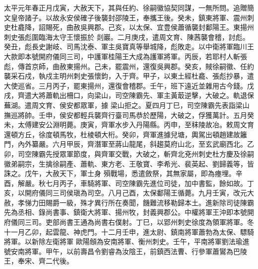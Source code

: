 \begin{pinyinscope}
 太平元年春正月戊寅，大赦天下，其與任約、徐嗣徽協契同謀，一無所問。追贈簡文皇帝諸子。以故永安侯確子後襲封邵陵王，奉攜王後。癸未，鎮東將軍、震州刺史杜龕降，詔賜死，曲赦吳興郡。己亥，以太保、宜豊侯蕭循襲封鄱陽王。東揚州刺史張彪圍臨海太守王懷振於
 剡巖。二月庚戌，遣周文育、陳茜襲會稽，討彪。癸丑，彪長史謝岐、司馬沈泰、軍主吳寶真等舉城降，彪敗走。以中衛將軍臨川王大款即本號開府儀同三司，中護軍桂陽王大成為護軍將軍。丙辰，若耶村人斬張彪，傳首京師，曲赦東揚州。己未，罷震州，還復吳興郡。癸亥，賊徐嗣徽、任約襲采石戍，執戍主明州刺史張懷鈞，入于齊。甲子，以東土經杜龕、張彪抄暴，遣大使巡省。三月丙子，罷東揚州，還復會稽郡。壬午，班下遠近並雜用古今錢。戊戌，齊遣大將蕭軌出柵口，向梁山，司空陳霸先、軍主黃菆逆擊，大破之。軌退保蕪湖。遣周文育、侯安都眾軍，據
 梁山拒之。夏四月丁巳，司空陳霸先表詣梁山撫巡將帥。壬申，侯安都輕兵襲齊行臺司馬恭於歷陽，大破之，俘獲萬計。五月癸未，太傅建安公淵明薨。庚寅，齊軍水步入丹陽縣。丙申，至秣陵故冶。敕周文育還頓方丘，徐度頓馬牧，杜棱頓大桁。癸卯，齊軍進據兒塘，輿駕出頓趙建故籬門，內外纂嚴。六月甲辰，齊潛軍至蔣山龍尾，斜趨莫府山北，至玄武廟西北。乙卯，司空陳霸先授眾軍節度，與齊軍交戰，大破之，斬齊北兗州刺史杜方慶及徐嗣徽弟嗣宗，生擒徐嗣產、蕭軌、東方老、王敬寶、李希光、裴英起、劉歸義等，皆誅之。戊午，大赦天下，軍士身
 殞戰場，悉遣斂祭，其無家屬，即為瘞埋。辛酉，解嚴。秋七月丙子，車騎將軍、司空陳霸先進位司徒，加中書監，餘如故。丁亥，以開府儀同三司侯瑱為司空。八月己酉，太保鄱陽王循薨。九月壬寅，改元大赦，孝悌力田賜爵一級，殊才異行所在奏聞，饑難流移勒歸本土。進新除司徒陳霸先為丞相、錄尚書事、鎮衛大將軍、揚州牧，封義興郡公。中權將軍王沖即本號開府儀同三司。吏部尚書王通為尚書右僕射。丁巳，以郢州刺史徐度為領軍將軍。冬十一月乙卯，起雲龍、神虎門。十二月壬申，進太尉、鎮南將軍蕭勃為太保、驃騎將軍。以新除左衛將軍
 歐陽頠為安南將軍、衡州刺史。壬午，平南將軍劉法瑜進號安南將軍。甲午，以前壽昌令劉睿為汝陰王，前鎮西法曹、行參軍蕭鸑為巴陵王，奉宋、齊二代後。




\end{pinyinscope}
